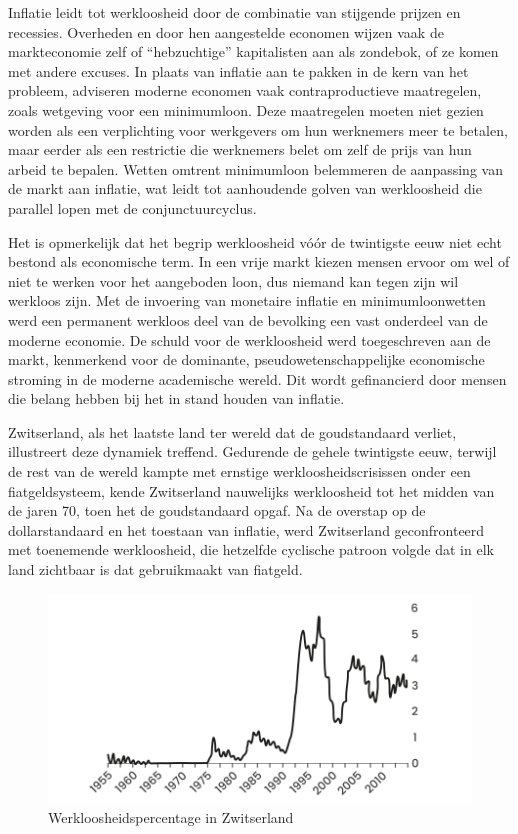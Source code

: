 Inflatie leidt tot werkloosheid door de combinatie van stijgende prijzen en recessies. Overheden en door hen aangestelde economen wijzen vaak de markteconomie zelf of ``hebzuchtige'' kapitalisten aan als zondebok, of ze komen met andere excuses. In plaats van inflatie aan te pakken in de kern van het probleem, adviseren moderne economen vaak contraproductieve maatregelen, zoals wetgeving voor een minimumloon. Deze maatregelen moeten niet gezien worden als een verplichting voor werkgevers om hun werknemers meer te betalen, maar eerder als een restrictie die werknemers belet om zelf de prijs van hun arbeid te bepalen. Wetten omtrent minimumloon belemmeren de aanpassing van de markt aan inflatie, wat leidt tot aanhoudende golven van werkloosheid die parallel lopen met de conjunctuurcyclus.

Het is opmerkelijk dat het begrip werkloosheid vóór de twintigste eeuw
niet echt bestond als economische term. In een vrije markt kiezen mensen
ervoor om wel of niet te werken voor het aangeboden loon, dus niemand
kan tegen zijn wil werkloos zijn. Met de invoering van monetaire
inflatie en minimumloonwetten werd een permanent werkloos deel van de
bevolking een vast onderdeel van de moderne economie. De schuld voor de
werkloosheid werd toegeschreven aan de markt, kenmerkend voor de
dominante, pseudowetenschappelijke economische stroming in de moderne
academische wereld. Dit wordt gefinancierd door mensen die belang hebben
bij het in stand houden van inflatie.

Zwitserland, als het laatste land ter wereld dat de goudstandaard verliet, illustreert deze dynamiek treffend. Gedurende de gehele twintigste eeuw, terwijl de rest van de wereld kampte met ernstige werkloosheidscrisissen onder een fiatgeldsysteem, kende Zwitserland nauwelijks werkloosheid tot het midden van de jaren 70, toen het de goudstandaard opgaf.\autocite{42} Na de overstap op de dollarstandaard en het toestaan van inflatie, werd Zwitserland geconfronteerd met toenemende werkloosheid, die hetzelfde cyclische patroon volgde dat in elk land zichtbaar is dat gebruikmaakt van fiatgeld.

\begin{figure}[!htb]
\centering
    \includegraphics[width=\textwidth]{figures/fig7-1.png}
\caption[Werkloosheidspercentage in Zwitserland]{Werkloosheidspercentage in Zwitserland}
\label{fig7}
\end{figure}

